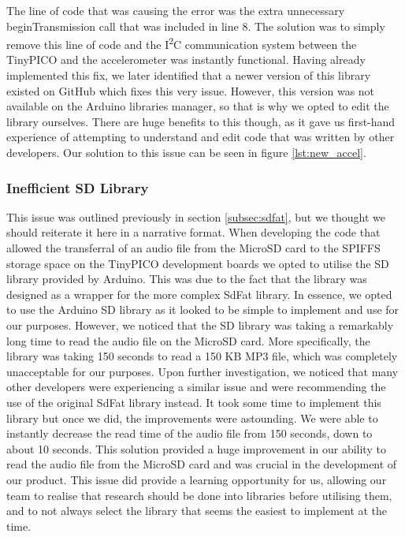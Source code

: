                 The line of code that was causing the error was the extra unnecessary beginTransmission call that was included in line 8. The solution was to simply remove this line of code and the I\textsuperscript{2}C communication system between the TinyPICO and the accelerometer was instantly functional. Having already implemented this fix, we later identified that a newer version of this library existed on GitHub which fixes this very issue. However, this version was not available on the Arduino libraries manager, so that is why we opted to edit the library ourselves. There are huge benefits to this though, as it gave us first-hand experience of attempting to understand and edit code that was written by other developers. Our solution to this issue can be seen in figure \ref{lst:new_accel}.

                

            \subsubsection{Inefficient SD Library}
            \label{subsubsec:sd}

                This issue was outlined previously in section \ref{subsec:sdfat}, but we thought we should reiterate it here in a narrative format. When developing the code that allowed the transferral of an audio file from the MicroSD card to the SPIFFS storage space on the TinyPICO development boards we opted to utilise the SD library provided by Arduino. This was due to the fact that the library was designed as a wrapper for the more complex SdFat library. In essence, we opted to use the Arduino SD library as it looked to be simple to implement and use for our purposes. However, we noticed that the SD library was taking a remarkably long time to read the audio file on the MicroSD card. More specifically, the library was taking 150 seconds to read a 150 KB MP3 file, which was completely unacceptable for our purposes. Upon further investigation, we noticed that many other developers were experiencing a similar issue and were recommending the use of the original SdFat library instead. It took some time to implement this library but once we did, the improvements were astounding. We were able to instantly decrease the read time of the audio file from 150 seconds, down to about 10 seconds. This solution provided a huge improvement in our ability to read the audio file from the MicroSD card and was crucial in the development of our product. This issue did provide a learning opportunity for us, allowing our team to realise that research should be done into libraries before utilising them, and to not always select the library that seems the easiest to implement at the time.

